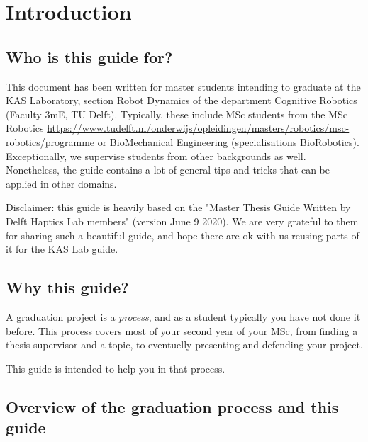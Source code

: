 \chapter{Introduction}

\section{Who is this guide for?}

This document has been written for master students intending to graduate at the KAS Laboratory, section Robot Dynamics of the department Cognitive Robotics (Faculty 3mE, TU Delft). Typically, these include MSc students from the MSc Robotics \url{https://www.tudelft.nl/onderwijs/opleidingen/masters/robotics/msc-robotics/programme} or BioMechanical Engineering (specialisations BioRobotics). Exceptionally, we supervise students from other backgrounds as well. 
Nonetheless, the guide contains a lot of general tips and tricks that can be applied in other domains.

Disclaimer: this guide is heavily based on the "Master Thesis Guide
Written by Delft Haptics Lab members" (version June 9 2020). We are very grateful to them for sharing such a beautiful guide, and hope there are ok with us reusing parts of it for the KAS Lab guide.

\section{Why this guide?}

A graduation project is a \textit{process}, and as a student typically you have not done it before.
This process covers most of your second year of your MSc, from finding a thesis supervisor and a topic, to eventuelly presenting and defending your project.

This guide is intended to help you in that process. 


\section{Overview of the graduation process and this guide}

\begin{list}
\end{list}